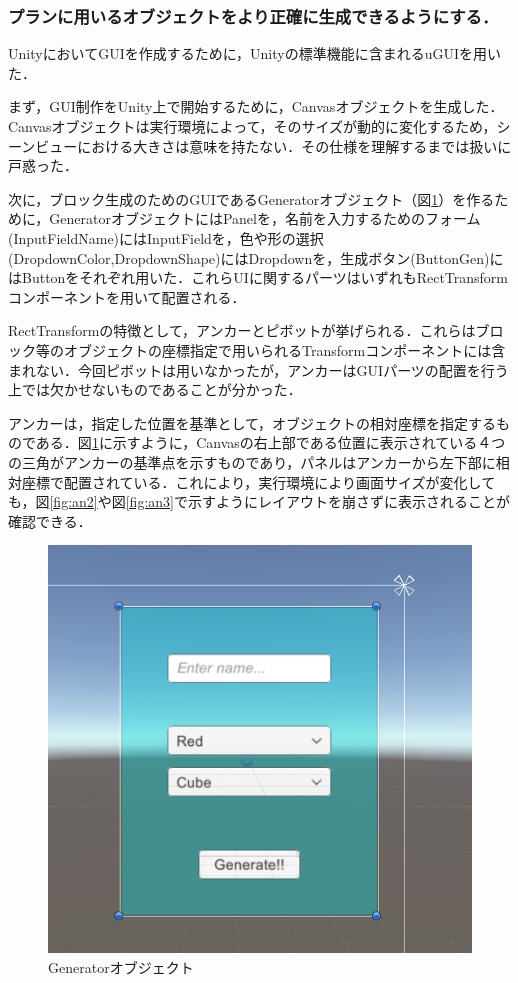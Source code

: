 \documentclass[12pt]{jarticle}
\begin{document}
\subsubsection{プランに用いるオブジェクトをより正確に生成できるようにする．}
Unity\cite{unity}においてGUIを作成するために，Unityの標準機能に含まれるuGUI\cite{ugui}を用いた．

まず，GUI制作をUnity上で開始するために，Canvasオブジェクトを生成した．Canvasオブジェクトは実行環境によって，そのサイズが動的に変化するため，シーンビューにおける大きさは意味を持たない．その仕様を理解するまでは扱いに戸惑った．

次に，ブロック生成のためのGUIであるGeneratorオブジェクト（図\ref{fig:an1}）を作るために，GeneratorオブジェクトにはPanelを，名前を入力するためのフォーム(InputFieldName)にはInputFieldを，色や形の選択(DropdownColor,DropdownShape)にはDropdownを，生成ボタン(ButtonGen)にはButtonをそれぞれ用いた．これらUIに関するパーツはいずれもRectTransformコンポーネントを用いて配置される．

RectTransformの特徴として，アンカーとピボットが挙げられる．これらはブロック等のオブジェクトの座標指定で用いられるTransformコンポーネントには含まれない．今回ピボットは用いなかったが，アンカーはGUIパーツの配置を行う上では欠かせないものであることが分かった．

アンカーは，指定した位置を基準として，オブジェクトの相対座標を指定するものである．図\ref{fig:an1}に示すように，Canvasの右上部である位置に表示されている４つの三角がアンカーの基準点を示すものであり，パネルはアンカーから左下部に相対座標で配置されている．これにより，実行環境により画面サイズが変化しても，図\ref{fig:an2}や図\ref{fig:an3}で示すようにレイアウトを崩さずに表示されることが確認できる．

\begin{figure}[!hbt]
  \begin{center}
    \includegraphics[scale=0.5]{images/BWP_Work6/anchor1.png}
  \end{center}
  \caption{Generatorオブジェクト}
  \label{fig:an1}
\end{figure}
\end{document}

